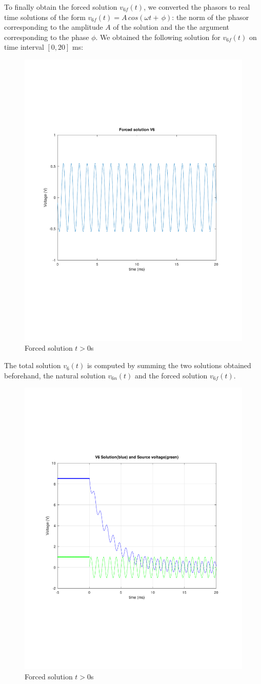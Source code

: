 To finally obtain the forced solution $v_{6f}(t)$, we converted the phasors to real time solutions of the form $v_{6f}(t) = A\, cos(\omega t+ \, \phi)$: the norm of the phasor corresponding to the amplitude $A$ of the solution and the the argument corresponding to the phase $\phi$. We obtained the following solution for $v_{6f}(t)$ on time interval $[0,20]$ ms:



\begin{figure}[h!] \centering
\includegraphics[width=0.6\linewidth]{../mat/forced_1.pdf}
\caption{Forced solution $t > 0$s}
\label{fig:TForcedP}
\end{figure}


The total solution $v_6(t)$ is computed by summing the two solutions obtained beforehand, the natural solution $v_{6n}(t)$ and the forced solution $v_{6f}(t)$.


\begin{figure}[h!] \centering
\includegraphics[width=0.6\linewidth]{../mat/fullSolution.pdf}
\caption{Forced solution $t > 0$s}
\label{fig:TForcedP}
\end{figure}


